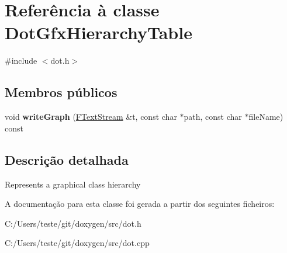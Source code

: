 \hypertarget{class_dot_gfx_hierarchy_table}{\section{Referência à classe Dot\-Gfx\-Hierarchy\-Table}
\label{class_dot_gfx_hierarchy_table}
}


{\ttfamily \#include $<$dot.\-h$>$}

\subsection*{Membros públicos}
\begin{DoxyCompactItemize}
\item 
\hypertarget{class_dot_gfx_hierarchy_table_a556f527ebfb8e954093e69e3784e7daf}{void {\bfseries write\-Graph} (\hyperlink{class_f_text_stream}{F\-Text\-Stream} \&t, const char $\ast$path, const char $\ast$file\-Name) const }\label{class_dot_gfx_hierarchy_table_a556f527ebfb8e954093e69e3784e7daf}

\end{DoxyCompactItemize}


\subsection{Descrição detalhada}
Represents a graphical class hierarchy 

A documentação para esta classe foi gerada a partir dos seguintes ficheiros\-:\begin{DoxyCompactItemize}
\item 
C\-:/\-Users/teste/git/doxygen/src/dot.\-h\item 
C\-:/\-Users/teste/git/doxygen/src/dot.\-cpp\end{DoxyCompactItemize}
